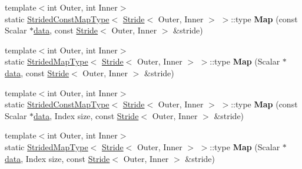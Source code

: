 \begin{Indent}
\begin{DoxyCompactItemize}
\mbox{\label{class_eigen_1_1_plain_object_base_a8ed320f4d926ab401117564cafc3e232}} 
{\footnotesize template$<$int Outer, int Inner$>$ }\\static \mbox{\hyperlink{struct_eigen_1_1_plain_object_base_1_1_strided_const_map_type}{Strided\+Const\+Map\+Type}}$<$ \mbox{\hyperlink{class_eigen_1_1_stride}{Stride}}$<$ Outer, Inner $>$ $>$\+::type {\bfseries Map} (const Scalar $\ast$\mbox{\hyperlink{class_eigen_1_1_plain_object_base_ac25699535374b1854cf8494e44ad31b2}{data}}, const \mbox{\hyperlink{class_eigen_1_1_stride}{Stride}}$<$ Outer, Inner $>$ \&stride)
\item 
\mbox{\label{class_eigen_1_1_plain_object_base_a240ab54b8839d02bdd35e358a3d66b73}} 
{\footnotesize template$<$int Outer, int Inner$>$ }\\static \mbox{\hyperlink{struct_eigen_1_1_plain_object_base_1_1_strided_map_type}{Strided\+Map\+Type}}$<$ \mbox{\hyperlink{class_eigen_1_1_stride}{Stride}}$<$ Outer, Inner $>$ $>$\+::type {\bfseries Map} (Scalar $\ast$\mbox{\hyperlink{class_eigen_1_1_plain_object_base_ac25699535374b1854cf8494e44ad31b2}{data}}, const \mbox{\hyperlink{class_eigen_1_1_stride}{Stride}}$<$ Outer, Inner $>$ \&stride)
\item 
\mbox{\label{class_eigen_1_1_plain_object_base_aebf9df309b9b6f4e5cc0d495a423f749}} 
{\footnotesize template$<$int Outer, int Inner$>$ }\\static \mbox{\hyperlink{struct_eigen_1_1_plain_object_base_1_1_strided_const_map_type}{Strided\+Const\+Map\+Type}}$<$ \mbox{\hyperlink{class_eigen_1_1_stride}{Stride}}$<$ Outer, Inner $>$ $>$\+::type {\bfseries Map} (const Scalar $\ast$\mbox{\hyperlink{class_eigen_1_1_plain_object_base_ac25699535374b1854cf8494e44ad31b2}{data}}, Index size, const \mbox{\hyperlink{class_eigen_1_1_stride}{Stride}}$<$ Outer, Inner $>$ \&stride)
\item 
\mbox{\label{class_eigen_1_1_plain_object_base_aaf22e2ddbebc397d1e6b17a95af8e7d4}} 
{\footnotesize template$<$int Outer, int Inner$>$ }\\static \mbox{\hyperlink{struct_eigen_1_1_plain_object_base_1_1_strided_map_type}{Strided\+Map\+Type}}$<$ \mbox{\hyperlink{class_eigen_1_1_stride}{Stride}}$<$ Outer, Inner $>$ $>$\+::type {\bfseries Map} (Scalar $\ast$\mbox{\hyperlink{class_eigen_1_1_plain_object_base_ac25699535374b1854cf8494e44ad31b2}{data}}, Index size, const \mbox{\hyperlink{class_eigen_1_1_stride}{Stride}}$<$ Outer, Inner $>$ \&stride)

\end{DoxyCompactItemize}
\end{Indent}
